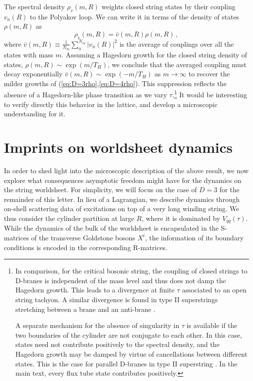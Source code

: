 \documentclass[
 reprint,
 amsmath,
 pre,
 amssymb,
 nofootinbib,
 aps,
 longbibliography,
]{revtex4-1}
\newcommand{\<}{{\langle}}
\renewcommand{\>}{{\rangle}}
\begin{document}
The spectral density $\rho_v( m,R)$ weights closed string states by their coupling $v_n(R)$ to the Polyakov loop. We can write it in terms of the density of states $\rho( m,R)$ as
\begin{equation}
    \rho_v( m,R) = \bar v( m,R) \rho( m,R)\,,
\end{equation}
where $\bar v( m,R) \equiv \frac{1}{N_ m}\sum_n^{N_ m} |v_n(R)|^2$ is the average of couplings over all the states with mass $ m$. Assuming a Hagedorn growth \cite{Hagedorn:1965st} for the closed string density of states, $\rho( m,R) \sim \exp( m/T_H)$, we conclude that the averaged coupling must decay exponentially $\bar v( m,R) \sim \exp(- m/T_H)$ as $ m\to \infty$ to recover the milder growths of (\ref{eq:D=3rho},\ref{eq:D=4rho}). This suppression reflects the absence of a Hagedorn-like phase transition as we vary $\tau$.\footnote{In comparison, for the critical bosonic string, the coupling of closed strings to D-branes is independent of the mass level and thus does not damp the Hagedorn growth. This leads to a divergence at finite $\tau$ associated to an open string tachyon. A similar divergence is found in type II superstrings stretching between a brane and an anti-brane \cite{Banks:1995ch}.

A separate mechanism for the absence of singularity in $\tau$ is available if the two boundaries of the cylinder are not conjugate to each other. In this case, states need not contribute positively to the spectral density, and the Hagedorn growth may be damped by virtue of cancellations between different states. This is the case for parallel D-branes in type II superstring \cite{Polchinski:1995mt}. In the main text, every flux tube state contributes positively.}
It would be interesting to verify directly this behavior in the lattice, and develop a microscopic understanding for it.

\section{Imprints on worldsheet dynamics}
\label{sec:IV}

In order to shed light into the microscopic description of the above result, we now explore what consequences asymptotic freedom might have for the dynamics on the string worldsheet. For simplicity, we will focus on the case of $D=3$ for the remainder of this letter. In lieu of a Lagrangian, we describe dynamics through on-shell scattering data of excitations on top of a very long winding string. We thus consider the cylinder partition at large $R$, where it is dominated by $V_{q\bar{q}}(\tau)$. While the dynamics of the bulk of the worldsheet is encapsulated in the S-matrices of the transverse Goldstone bosons $X^i$, the information of its boundary conditions is encoded in the corresponding R-matrices.
\end{document}
